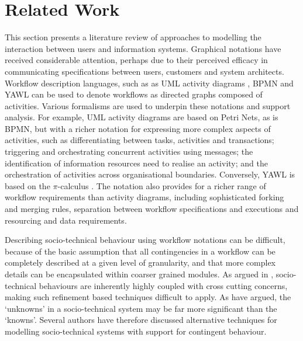 \documentclass{llncs}
\newcommand{\picalc}{\(\pi\)-calculus }
\begin{document}

\section{Related Work}
\label{sec:related}


This section presents a literature review of approaches to modelling the interaction between users and information
systems.  Graphical notations have received considerable attention, perhaps due to their perceived efficacy in
communicating specifications between users, customers and system architects.  Workflow description languages, such as as
UML activity diagrams \citep{omg07omguml}, BPMN \citep{omg2011omgbpmn} and YAWL \citep{hofstede2010yawl} can be used to
denote workflows as directed graphs composed of activities.  Various formalisms are used to underpin these notations and
support analysis.  For example, UML activity diagrams are based on Petri Nets, as is BPMN, but with a richer notation
for expressing more complex aspects of activities, such as differentiating between tasks, activities and transactions;
triggering and orchestrating concurrent activities using messages; the identification of information resources need to
realise an activity; and the orchestration of activities across organisational boundaries.  Conversely, YAWL is based on
the \picalc \citep{aalst2004workflow}.  The notation also provides for a richer range of workflow requirements than
activity diagrams, including sophisticated forking and merging rules, separation between workflow specifications and
executions and resourcing and data requirements.

Describing socio-technical behaviour using workflow notations can be difficult, because of the basic assumption that all
contingencies in a workflow can be completely described at a given level of granularity, and that more complex details
can be encapsulated within coarser grained modules.  As argued in , socio-technical
behaviours are inherently highly coupled with cross cutting concerns, making such refinement based techniques difficult
to apply.  As \citet{israilidis13ignorance} have argued, the `unknowns' in a socio-technical system may be far more
significant than the `knowns'. Several authors have therefore discussed alternative techniques for modelling
socio-technical systems with support for contingent behaviour.
\end{document}
